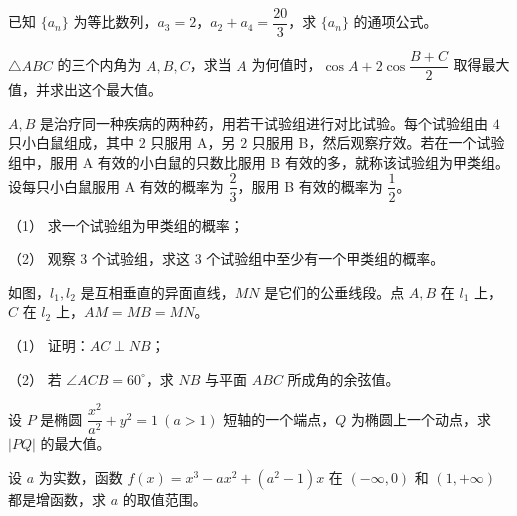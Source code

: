\begin{question}
已知 $\{a_n\}$ 为等比数列，$a_3=2$，$a_2+a_4=\dfrac{20}{3}$，求 $\{a_n\}$ 的通项公式。

\end{question}
\begin{question}
$\triangle ABC$ 的三个内角为 $A,B,C$，求当 $A$ 为何值时，$\cos A+2\cos\dfrac{B+C}{2}$ 取得最大值，并求出这个最大值。

\end{question}
\begin{question}
$A,B$ 是治疗同一种疾病的两种药，用若干试验组进行对比试验。每个试验组由 $4$ 只小白鼠组成，其中 $2$ 只服用 A，另 $2$ 只服用 B，然后观察疗效。若在一个试验组中，服用 A 有效的小白鼠的只数比服用 B 有效的多，就称该试验组为甲类组。设每只小白鼠服用 A 有效的概率为 $\dfrac23$，服用 B 有效的概率为 $\dfrac12$。

（1） 求一个试验组为甲类组的概率；

（2） 观察 $3$ 个试验组，求这 $3$ 个试验组中至少有一个甲类组的概率。

\Needspace{0.4\textheight}
\end{question}
\begin{question}
如图，$l_1,l_2$ 是互相垂直的异面直线，$MN$ 是它们的公垂线段。点 $A,B$ 在 $l_1$ 上，$C$ 在 $l_2$ 上，$AM=MB=MN$。
\nopagebreak[4]
\begin{center}\end{center}
\nopagebreak[4]
（1） 证明：$AC\perp NB$；

（2） 若 $\angle ACB=60^\circ$，求 $NB$ 与平面 $ABC$ 所成角的余弦值。

\end{question}
\begin{question}
设 $P$ 是椭圆 $\dfrac{x^2}{a^2}+y^2=1\ (a>1)$ 短轴的一个端点，$Q$ 为椭圆上一个动点，求 $|PQ|$ 的最大值。

\end{question}
\begin{question}
设 $a$ 为实数，函数 $f(x)=x^3-ax^2+(a^2-1)x$ 在 $(-\infty,0)$ 和 $(1,+\infty)$ 都是增函数，求 $a$ 的取值范围。

\end{question}
